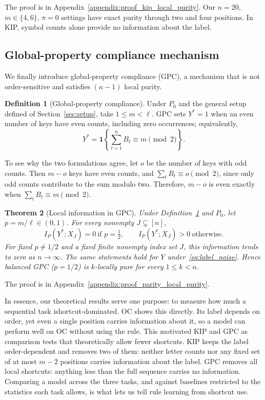 \documentclass{article} %
\theoremstyle{plain}
\newtheorem{theorem}{Theorem}[section]
\theoremstyle{definition}
\newtheorem{definition}[theorem]{Definition}
\theoremstyle{remark}
\begin{document}
The proof is in Appendix~\ref{appendix:proof_kip_local_purity}. Our $n=20$, $m\in\{4,6\}$, $\pi=0$ settings have exact purity through two and four positions. In KIP, symbol counts alone provide no information about the label.

\subsection{Global-property compliance mechanism}
\label{sec:parity}
We finally introduce global-property compliance (GPC), a mechanism that is not order-sensitive and satisfies $(n-1)$ local purity.

\begin{definition}[Global-property compliance]
\label{def:parity}
Under $P_0$ and the general setup defined of Section~\ref{sec:setup}, take $1\leq m<\ell$. GPC sets $Y^*=1$ when an even number of keys have even counts, including zero occurrences; equivalently,
\begin{equation}
\label{eq:gpc_label}
Y^*=\mathbf{1}\!\left\{\sum_{t=1}^n B_t\equiv m\pmod 2\right\}.
\end{equation}
\end{definition}

To see why the two formulations agree, let \(o\) be the number of keys with odd counts. Then \(m-o\) keys have even counts, and \(\sum_t B_t\equiv o\pmod 2\), since only odd counts contribute to the sum modulo two. Therefore, \(m-o\) is even exactly when \(\sum_t B_t\equiv m\pmod 2\).

\begin{theorem}[Local information in GPC]
\label{thm:parity_local_purity}
Under Definition~\ref{def:parity} and $P_0$, let $p=m/\ell\in(0,1)$. For every nonempty $J\subsetneq[n]$,
\[
I_P(Y^*;X_J)=0\ \text{if }p=\tfrac12,\qquad I_P(Y^*;X_J)>0\ \text{otherwise}.
\]
For fixed $p\neq1/2$ and a fixed finite nonempty index set $J$, this information tends to zero as $n\to\infty$. The same statements hold for $Y$ under~\eqref{eq:label_noise}. Hence balanced GPC ($p=1/2$) is $k$-locally pure for every $1\leq k<n$.
\end{theorem}

The proof is in Appendix~\ref{appendix:proof_parity_local_purity}. 

In essence, our theoretical results serve one purpose: to measure how much a sequential task ishortcut-dominated. OC shows this directly. Its label depends on order, yet even a single position carries information about it, so a model can perform well on OC without using the rule. This motivated KIP and GPC as comparison tests that theoretically allow fewer shortcuts. KIP keeps the label order-dependent and removes two of them: neither letter counts nor any fixed set of at most $m-2$ positions carries information about the label. GPC removes all local shortcuts: anything less than the full sequence carries no information. Comparing a model across the three tasks, and against baselines restricted to the statistics each task allows, is what lets us tell rule learning from shortcut use.
\end{document}

